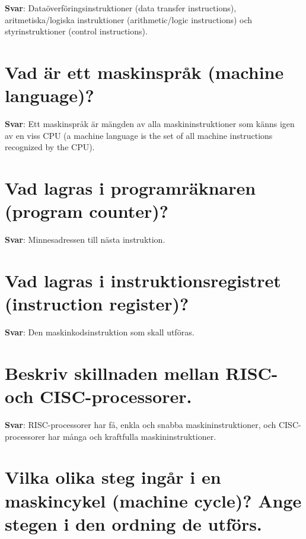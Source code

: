 \documentclass[a4paper,11pt,oneside]{book}
\begin{document}
\begin{sloppypar}
\label{q:93:sa:sv:True}

\textbf{Svar}: Data\"overf\"oringsinstruktioner (data transfer instructions), aritmetiska/logiska instruktioner (arithmetic/logic instructions) och styrinstruktioner (control instructions).



\section{Vad \"ar ett maskinspr\r{a}k (machine language)?}

\label{q:94:sa:sv:True}

\textbf{Svar}: Ett maskinspr\r{a}k \"ar m\"angden av alla maskininstruktioner som k\"anns igen av en viss CPU (a machine language is the set of all machine instructions recognized by the CPU).



\section{Vad lagras i programr\"aknaren (program counter)?}

\label{q:95:sa:sv:True}

\textbf{Svar}: Minnesadressen till n\"asta instruktion.



\section{Vad lagras i instruktionsregistret (instruction register)?}

\label{q:96:sa:sv:True}

\textbf{Svar}: Den maskinkodsinstruktion som skall utf\"oras.



\section{Beskriv skillnaden mellan RISC- och CISC-processorer.}

\label{q:97:sa:sv:True}

\textbf{Svar}: RISC-processorer har f\r{a}, enkla och snabba maskininstruktioner, och CISC-processorer har m\r{a}nga och kraftfulla maskininstruktioner.



\section{Vilka olika steg ing\r{a}r i en maskincykel (machine cycle)? Ange stegen i den ordning de utf\"ors.}


\end{sloppypar}
\end{document}
